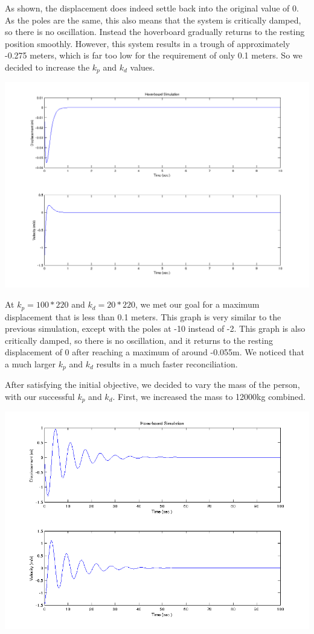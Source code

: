 \documentclass[titlepage]{article}
\begin{document}
As shown, the displacement does indeed settle back into the original value of 0. As the poles are the same, this also means that the system is critically damped, so there is no oscillation. Instead the hoverboard gradually returns to the resting position smoothly. However, this system results in a trough of approximately -0.275 meters, which is far too low for the requirement of only 0.1 meters. So we decided to increase the $k_p$ and $k_d$ values.

\includegraphics[scale=0.5]{k_p100mk_d20m.png}

At $k_p = 100*220$ and $k_d = 20*220$, we met our goal for a maximum displacement that is less than 0.1 meters. This graph is very similar to the previous simulation, except with the poles at -10 instead of -2. This graph is also critically damped, so there is no oscillation, and it returns to the resting displacement of 0 after reaching a maximum of around -0.055m. We noticed that a much larger $k_p$ and $k_d$ results in a much faster reconciliation.

After satisfying the initial objective, we decided to vary the mass of the person, with our successful $k_p$ and $k_d$. First, we increased the mass to 12000kg combined.

\includegraphics[scale=0.66]{guymass12000k_p100120k_d20120.png}
\end{document}
